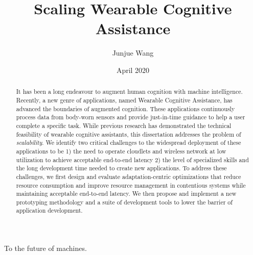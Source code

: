 



\frontmatter

\title{
    {\bf Scaling Wearable Cognitive Assistance}
}
\author{Junjue Wang}
\date{April 2020}
\trnumber{}

\vspace{3cm}





\maketitle

\begin{dedication}
    To the future of machines.
\end{dedication}


\begin{abstract}
    It has been a long endeavour to augment human cognition with machine
    intelligence. Recently, a new genre of applications, named Wearable
    Cognitive Assistance, has advanced the boundaries of augmented cognition.
    These applications continuously process data from body-worn sensors and
    provide just-in-time guidance to help a user complete a specific task. While
    previous research has demonstrated the technical feasibility of wearable
    cognitive assistants, this dissertation addresses the problem of
    \textit{scalability}. We identify two critical challenges to the widespread
    deployment of these applications to be 1) the need to operate cloudlets and
    wireless network at low utilization to achieve acceptable end-to-end latency
    2) the level of specialized skills and the long development time needed to
    create new applications. To address these challenges, we first design and
    evaluate adaptation-centric optimizations that reduce resource consumption
    and improve resource management in contentious systems while maintaining
    acceptable end-to-end latency. We then propose and implement a new
    prototyping methodology and a suite of development tools to lower the
    barrier of application development.
\end{abstract}


